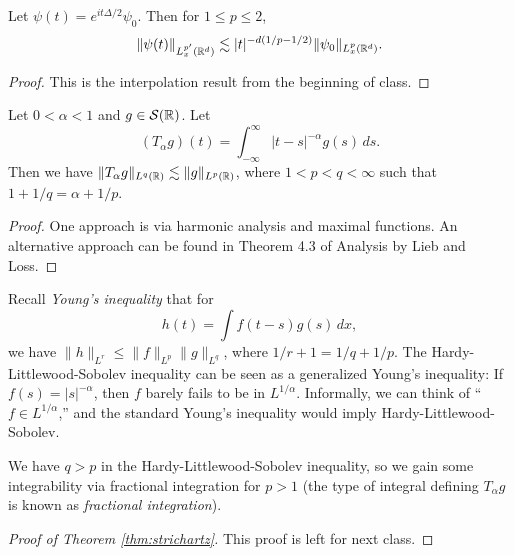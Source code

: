 \begin{lemma}
  Let $\psi(t) = e^{it \Delta / 2} \psi_0$.
  Then for $1 \le p \le 2$,
  \[
    \|\psi(t) \|_{L^{p'}_x(\mathbb{R}^d)}
    \lesssim |t|^{-d (1 / p - 1 / 2)} \|\psi_0\|_{L^p_x(\mathbb{R}^d)}.
  \]
\end{lemma}

\begin{proof}
  This is the interpolation result from the beginning
  of class.
\end{proof}

\begin{lemma}
  Let $0 < \alpha < 1$ and $g \in \mathcal{S}(\mathbb{R})$.
  Let
  \[
    (T_\alpha g)(t) = \int_{-\infty}^\infty |t - s|^{-\alpha} g(s)\, ds.
  \]
  Then we have
  $\|T_\alpha g\|_{L^q(\mathbb{R})} \lesssim \|g\|_{L^p(\mathbb{R})}$,
  where $1 < p < q < \infty$ such that
  $1 + 1 / q = \alpha + 1 / p$.
\end{lemma}

\begin{proof}
  One approach is via harmonic analysis and maximal
  functions. An alternative approach can be found in
  Theorem 4.3 of Analysis by Lieb and Loss.
\end{proof}

\begin{remark}
  Recall \emph{Young's inequality} that for
  \[
    h(t) = \int f(t - s) g(s)\, dx,
  \]
  we have $\|h\|_{L^r} \le \|f\|_{L^p} \|g\|_{L^q}$,
  where $1 / r + 1 = 1 / q + 1 / p$. The
  Hardy-Littlewood-Sobolev inequality can be
  seen as a generalized Young's inequality: If
  $f(s) = |s|^{-\alpha}$, then $f$ barely fails to be
  in $L^{1 / \alpha}$. Informally, we can think of
  ``$f \in L^{1 / \alpha}$,'' and the standard
  Young's inequality would imply
  Hardy-Littlewood-Sobolev.
\end{remark}

\begin{remark}
  We have $q > p$ in the Hardy-Littlewood-Sobolev
  inequality, so we gain some integrability via
  fractional integration for $p > 1$
  (the type of integral defining
  $T_\alpha g$ is known as \emph{fractional integration}).
\end{remark}

\begin{proof}[Proof of Theorem \ref{thm:strichartz}]
  This proof is left for next class.
\end{proof}
